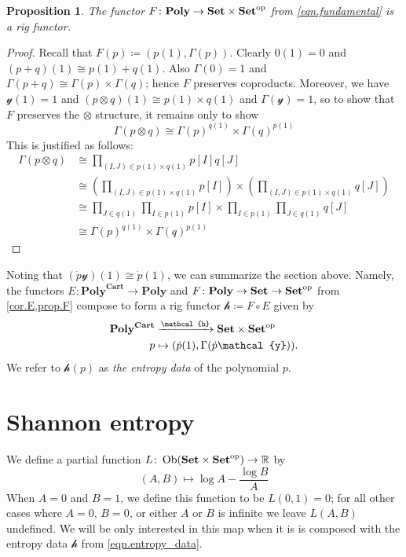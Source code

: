 \documentclass[11pt, one side, article]{memoir}
\theoremstyle{definition}
\theoremstyle{plain}
\newtheorem{proposition}[definitionx]{Proposition}
\DeclareMathOperator{\ob}{Ob}
\newcommand{\Cat}[1]{\mathbf{#1}}%
\newcommand{\To}[2][]{\xrightarrow[#1]{#2}}
\newcommand{\op}{^\tn{op}}
\newcommand{\tn}[1]{\textnormal{#1}}
\newcommand{\rr}{\mathbb{R}}
\newcommand{\smset}{\Cat{Set}}
\newcommand{\yon}{\mathcal{y}}
\newcommand{\poly}{\Cat{Poly}}
\newcommand{\polycart}{\poly^{\Cat{Cart}}}
\newcommand{\hh}{\mathcal{h}}
\newcommand{\0}{\textsf{0}}
\newcommand{\1}{\tn{\textsf{1}}}
\begin{document}
\begin{proposition}\label{prop.F}
The functor $F\colon\poly\to\smset\times\smset\op$ from \eqref{eqn.fundamental} is a rig functor.
\end{proposition}
\begin{proof}
Recall that $F(p)\coloneqq(p(1),\Gamma(p))$. Clearly $0(1)=0$ and $(p+q)(1)\cong p(1)+q(1)$. Also $\Gamma(0)=1$ and $\Gamma(p+q)\cong\Gamma(p)\times\Gamma(q)$; hence $F$ preserves coproducts. Moreover, we have $\yon(1)=1$ and $(p\otimes q)(1)\cong p(1)\times q(1)$ and $\Gamma(\yon)= 1$, so to show that $F$ preserves the $\otimes$ structure, it remains only to show 
\[
  \Gamma(p\otimes q)\cong \Gamma(p)^{q(1)}\times\Gamma(q)^{p(1)}
\]
This is justified as follows:
\begin{align*}
	\Gamma(p\otimes q)&\cong
	\prod_{(I,J)\in p(1)\times q(1)}p[I]q[J]\\&\cong
	\left(\prod_{(I,J)\in p(1)\times q(1)}p[I]\right)\times
		\left(\prod_{(I,J)\in p(1)\times q(1)}q[J]\right)\\&\cong
	\prod_{J\in q(1)}\prod_{I\in p(1)}p[I]\times\prod_{I\in p(1)}\prod_{J\in q(1)}q[J]\\&\cong
	\Gamma(p)^{q(1)}\times\Gamma(q)^{p(1)}	
\end{align*}
\end{proof}

Noting that $(\dot{p}\yon)(1)\cong\dot{p}(1)$, we can summarize the section above. Namely, the functors $E\colon\polycart\to\poly$ and $F\colon\poly\to\smset\to\smset\op$ from \cref{cor.E,prop.F} compose to form a rig functor $\hh\coloneqq F\circ E$ given by
\begin{equation}\label{eqn.entropy_data}
\begin{aligned}
	\polycart&\To{\mathcal{h}}\smset\times\smset\op\\
	p&\mapsto (\dot{p}(1),\Gamma(\dot{p}\yon)).
\end{aligned}
\end{equation}
We refer to $\hh(p)$ as \emph{the entropy data} of the polynomial $p$.

\section{Shannon entropy}\label{sec.entropy}

We define a partial function $L\colon\ob(\smset\times\smset\op)\to\rr$ by
\begin{equation}\label{eqn.L}
(A,B)\mapsto \log A-\frac{\log B}{A}
\end{equation}
When $A=0$ and $B=1$, we define this function to be $L(0,1)=0$; for all other cases where $A=0$, $B=0$, or either $A$ or $B$ is infinite we leave $L(A,B)$ undefined. We will be only interested in this map when it is is composed with the entropy data $\mathcal{h}$ from \eqref{eqn.entropy_data}.
\end{document}
